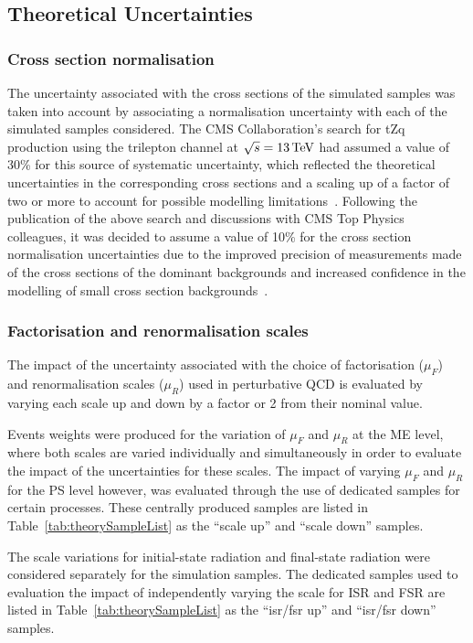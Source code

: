 \subsection{Theoretical Uncertainties}\label{sec:theorySysts}
\subsubsection{Cross section normalisation}
The uncertainty associated with the cross sections of the simulated samples was taken into account by associating a normalisation uncertainty with each of the simulated samples considered.
The CMS Collaboration's search for tZq production using the trilepton channel at $\sqrt{s} = 13\,\text{Te\hspace{-.08em}V}$ had assumed a value of 30\% for this source of systematic uncertainty, which reflected the theoretical uncertainties in the corresponding cross sections and a scaling up of a factor of two or more to account for possible modelling limitations~\cite{Sirunyan:2017nbr}.
Following the publication of the above search and discussions with CMS Top Physics colleagues, it was decided to assume a value of 10\% for the cross section normalisation uncertainties due to the improved precision of measurements made of the cross sections of the dominant backgrounds and increased confidence in the modelling of small cross section backgrounds~\cite{crossSectionSystematics,combineNick}.

\subsubsection{Factorisation and renormalisation scales}
The impact of the uncertainty associated with the choice of factorisation ($\mu_{F}$) and renormalisation scales ($\mu_{R}$) used in perturbative QCD is evaluated by varying each scale up and down by a factor or 2 from their nominal value.

Events weights were produced for the variation of $\mu_{F}$ and $\mu_{R}$ at the ME level, where both scales are varied individually and simultaneously in order to evaluate the impact of the uncertainties for these scales.
The impact of varying $\mu_{F}$ and $\mu_{R}$ for the PS level however, was evaluated through the use of dedicated samples for certain processes.
These centrally produced samples are listed in Table~\ref{tab:theorySampleList} as the ``scale up'' and ``scale down'' samples. 

The scale variations for initial-state radiation and final-state radiation were considered separately for the \ttbar simulation samples.
The dedicated \ttbar samples used to evaluation the impact of independently varying the scale for ISR and FSR are listed in Table~\ref{tab:theorySampleList} as the ``isr/fsr up'' and ``isr/fsr down'' samples.


